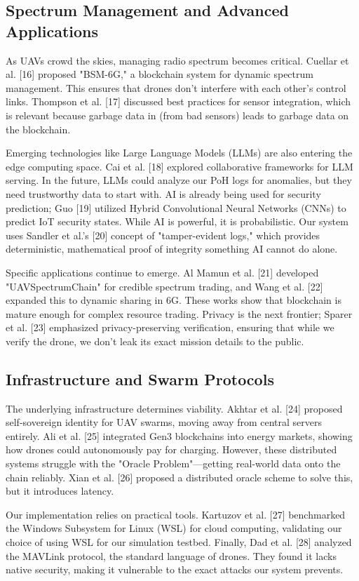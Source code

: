 \documentclass[preprint,12pt]{elsarticle}
\begin{document}
\subsection{Spectrum Management and Advanced Applications}
\label{subsec2-3}
As UAVs crowd the skies, managing radio spectrum becomes critical. Cuellar et al. [16] proposed "BSM-6G," a blockchain system for dynamic spectrum management. This ensures that drones don't interfere with each other's control links. Thompson et al. [17] discussed best practices for sensor integration, which is relevant because garbage data in (from bad sensors) leads to garbage data on the blockchain.


Emerging technologies like Large Language Models (LLMs) are also entering the edge computing space. Cai et al. [18] explored collaborative frameworks for LLM serving. In the future, LLMs could analyze our PoH logs for anomalies, but they need trustworthy data to start with. AI is already being used for security prediction; Guo [19] utilized Hybrid Convolutional Neural Networks (CNNs) to predict IoT security states. While AI is powerful, it is probabilistic. Our system uses Sandler et al.'s [20] concept of "tamper-evident logs," which provides deterministic, mathematical proof of integrity something AI cannot do alone.


Specific applications continue to emerge. Al Mamun et al. [21] developed "UAVSpectrumChain" for credible spectrum trading, and Wang et al. [22] expanded this to dynamic sharing in 6G. These works show that blockchain is mature enough for complex resource trading. Privacy is the next frontier; Sparer et al. [23] emphasized privacy-preserving verification, ensuring that while we verify the drone, we don't leak its exact mission details to the public.
\subsection{Infrastructure and Swarm Protocols}
\label{subsec2-4}
The underlying infrastructure determines viability. Akhtar et al. [24] proposed self-sovereign identity for UAV swarms, moving away from central servers entirely. Ali et al. [25] integrated Gen3 blockchains into energy markets, showing how drones could autonomously pay for charging. However, these distributed systems struggle with the "Oracle Problem"—getting real-world data onto the chain reliably. Xian et al. [26] proposed a distributed oracle scheme to solve this, but it introduces latency.


Our implementation relies on practical tools. Kartuzov et al. [27] benchmarked the Windows Subsystem for Linux (WSL) for cloud computing, validating our choice of using WSL for our simulation testbed. Finally, Dad et al. [28] analyzed the MAVLink protocol, the standard language of drones. They found it lacks native security, making it vulnerable to the exact attacks our system prevents.
\end{document}

